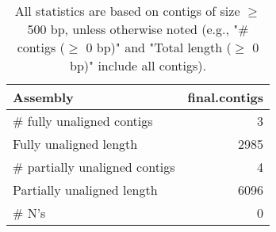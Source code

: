\documentclass[12pt,a4paper]{article}
\begin{document}
\begin{table}[ht]
\begin{center}
\caption{All statistics are based on contigs of size $\geq$ 500 bp, unless otherwise noted (e.g., "\# contigs ($\geq$ 0 bp)" and "Total length ($\geq$ 0 bp)" include all contigs).}
\begin{tabular}{|l*{1}{|r}|}
\hline
Assembly & final.contigs \\ \hline
\# fully unaligned contigs & 3 \\ \hline
Fully unaligned length & 2985 \\ \hline
\# partially unaligned contigs & 4 \\ \hline
Partially unaligned length & 6096 \\ \hline
\# N's & 0 \\ \hline
\end{tabular}
\end{center}
\end{table}
\end{document}
